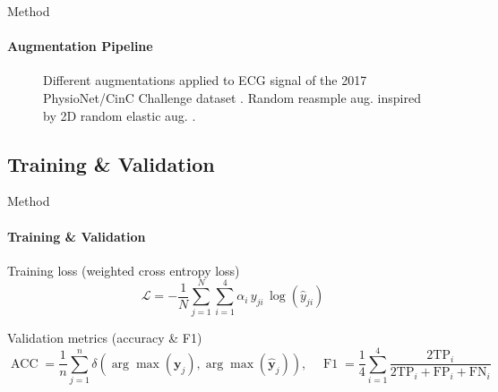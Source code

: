 \begin{frame}{Method}
\framesubtitle{Augmentation Pipeline}
    \vspace{-0.25cm}
    \begin{figure}[!ht]
        \setlength{\figH}{4.5cm}
        \setlength{\figW}{0.33\textwidth}
        \centering
        
        \caption{Different augmentations applied to ECG signal of the 2017 PhysioNet/CinC Challenge dataset \cite{Clifford2017}. Random reasmple aug. inspired by 2D random elastic aug. \cite{Simard2003}.}
        \label{fig:ecg_aug_3}
    \end{figure}
\end{frame}

\subsection{Training \& Validation}
\begin{frame}{Method}
\framesubtitle{Training \& Validation}
    \begin{block}{Training loss (weighted cross entropy loss)}
        $$\mathcal{L} = -\frac{1}{N}\sum_{j=1}^{N}\sum_{i=1}^{4}\alpha_{i}\,y_{ji}\,\log(\hat{y}_{ji})$$
    \end{block}
    \pause
    \begin{block}{Validation metrics (accuracy \& F1)}
        $$\operatorname{ACC}=\frac{1}{n}\sum_{j=1}^{n}\delta\left(\arg\max(\mathbf{y}_{j}), \arg\max(\hat{\mathbf{y}}_{j})\right),\quad \operatorname{F1}=\frac{1}{4}\sum_{i=1}^{4}\frac{2\text{TP}_{i}}{2\text{TP}_{i} + \text{FP}_{i} + \text{FN}_{i}}$$
    \end{block}
\end{frame}
